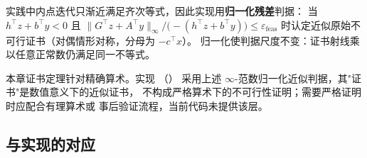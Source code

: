 实践中内点迭代只渐近满足齐次等式，因此实现用\textbf{归一化残差}判据：
当 $h^\top z + b^\top y < 0$ 且
$\|G^\top z + A^\top y\|_\infty / \big(-(h^\top z + b^\top y)\big) \le \varepsilon_{\mathrm{feas}}$
时认定近似原始不可行证书（对偶情形对称，分母为 $-c^\top x$）。
归一化使判据尺度不变：证书射线乘以任意正常数仍满足同一不等式。

\begin{gapnote}
本章证书定理针对精确算术。实现
（）
采用上述 $\infty$-范数归一化近似判据，其"证书"是数值意义下的近似证书，
不构成严格算术下的不可行性证明；需要严格证明时应配合有理算术或
事后验证流程，当前代码未提供该层。
\end{gapnote}

\subsection{与实现的对应}


